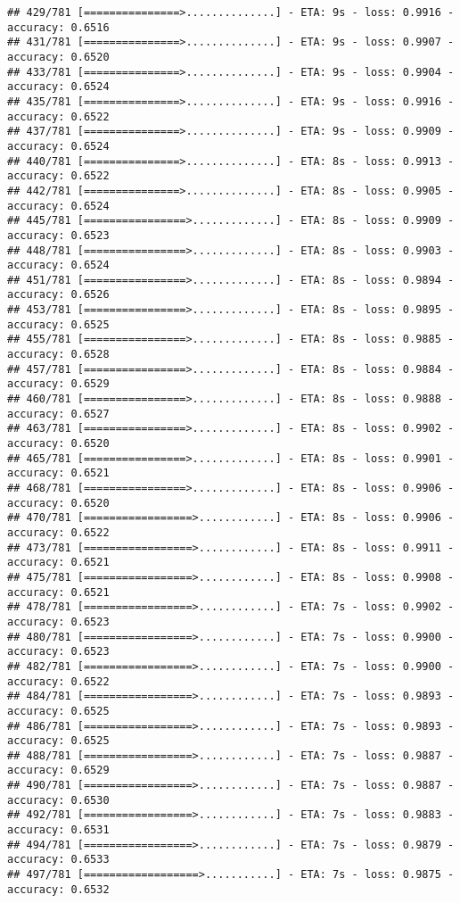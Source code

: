 \documentclass[
]{article}
\begin{document}
\begin{verbatim}
## 429/781 [===============>..............] - ETA: 9s - loss: 0.9916 - accuracy: 0.6516
## 431/781 [===============>..............] - ETA: 9s - loss: 0.9907 - accuracy: 0.6520
## 433/781 [===============>..............] - ETA: 9s - loss: 0.9904 - accuracy: 0.6524
## 435/781 [===============>..............] - ETA: 9s - loss: 0.9916 - accuracy: 0.6522
## 437/781 [===============>..............] - ETA: 9s - loss: 0.9909 - accuracy: 0.6524
## 440/781 [===============>..............] - ETA: 8s - loss: 0.9913 - accuracy: 0.6522
## 442/781 [===============>..............] - ETA: 8s - loss: 0.9905 - accuracy: 0.6524
## 445/781 [================>.............] - ETA: 8s - loss: 0.9909 - accuracy: 0.6523
## 448/781 [================>.............] - ETA: 8s - loss: 0.9903 - accuracy: 0.6524
## 451/781 [================>.............] - ETA: 8s - loss: 0.9894 - accuracy: 0.6526
## 453/781 [================>.............] - ETA: 8s - loss: 0.9895 - accuracy: 0.6525
## 455/781 [================>.............] - ETA: 8s - loss: 0.9885 - accuracy: 0.6528
## 457/781 [================>.............] - ETA: 8s - loss: 0.9884 - accuracy: 0.6529
## 460/781 [================>.............] - ETA: 8s - loss: 0.9888 - accuracy: 0.6527
## 463/781 [================>.............] - ETA: 8s - loss: 0.9902 - accuracy: 0.6520
## 465/781 [================>.............] - ETA: 8s - loss: 0.9901 - accuracy: 0.6521
## 468/781 [================>.............] - ETA: 8s - loss: 0.9906 - accuracy: 0.6520
## 470/781 [=================>............] - ETA: 8s - loss: 0.9906 - accuracy: 0.6522
## 473/781 [=================>............] - ETA: 8s - loss: 0.9911 - accuracy: 0.6521
## 475/781 [=================>............] - ETA: 8s - loss: 0.9908 - accuracy: 0.6521
## 478/781 [=================>............] - ETA: 7s - loss: 0.9902 - accuracy: 0.6523
## 480/781 [=================>............] - ETA: 7s - loss: 0.9900 - accuracy: 0.6523
## 482/781 [=================>............] - ETA: 7s - loss: 0.9900 - accuracy: 0.6522
## 484/781 [=================>............] - ETA: 7s - loss: 0.9893 - accuracy: 0.6525
## 486/781 [=================>............] - ETA: 7s - loss: 0.9893 - accuracy: 0.6525
## 488/781 [=================>............] - ETA: 7s - loss: 0.9887 - accuracy: 0.6529
## 490/781 [=================>............] - ETA: 7s - loss: 0.9887 - accuracy: 0.6530
## 492/781 [=================>............] - ETA: 7s - loss: 0.9883 - accuracy: 0.6531
## 494/781 [=================>............] - ETA: 7s - loss: 0.9879 - accuracy: 0.6533
## 497/781 [==================>...........] - ETA: 7s - loss: 0.9875 - accuracy: 0.6532

\end{verbatim}
\end{document}
